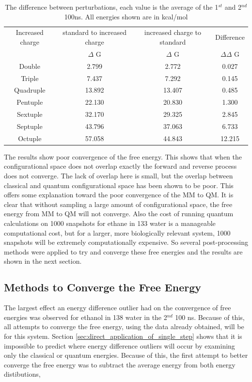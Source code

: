\begin{table}[ht]
 \caption{The difference between perturbations, each value is the average of the 1$^{st}$ and 2$^{nd}$ 100ns.  All energies shown are in kcal/mol}
  \begin{center}
  \begin{tabular}{c|c|c|c}
   \hline\hline
 Increased charge & standard to increased charge & increased charge to standard & Difference \\
 & $\Delta$ G & $\Delta$ G & $\Delta \Delta$ G  \\
\hline
 Double & 2.799 & 2.772 & 0.027 \\
\hline
 Triple & 7.437 & 7.292 & 0.145 \\
\hline
 Quadruple & 13.892 & 13.407 & 0.485 \\
\hline
 Pentuple & 22.130 & 20.830 & 1.300 \\
\hline
 Sextuple & 32.170 & 29.325 & 2.845 \\
\hline
 Septuple & 43.796 & 37.063 & 6.733 \\
\hline
 Octuple & 57.058 & 44.843 & 12.215 \\
  \end{tabular}\label{table:charge_differences}
 \end{center}
\end{table}


The results show poor convergence of the free energy.  This shows that when the configurational space does not overlap exactly the forward and reverse process does not converge.  The lack of overlap here is small, but the overlap between classical and quantum configurational space has been shown to be poor.  This offers some explanation toward the poor convergence of the MM to QM.  It is clear that without sampling a large amount of configurational space, the free energy from MM to QM will not converge.  Also the cost of running quantum calculations on 1000 snapshots for ethane in 133 water is a manageable computational cost, but for a larger, more biologically relevant system, 1000 snapshots will be extremely computationally expensive.  So several post-processing methods were applied to try and converge these free energies and the results are shown in the next section.

\subsection{Methods to Converge the Free Energy}

The largest effect an energy difference outlier had on the convergence of free energies was observed for ethanol in 138 water in the 2$^{nd}$ 100 ns.  Because of this, all attempts to converge the free energy, using the data already obtained, will be for this system.  Section \ref{sec:direct_application_of_single_step} shows that it is impossible to predict where energy difference outliers will occur by examining only the classical or quantum energies.  Because of this, the first attempt to better converge the free energy was to subtract the average energy from both energy distibutions,

